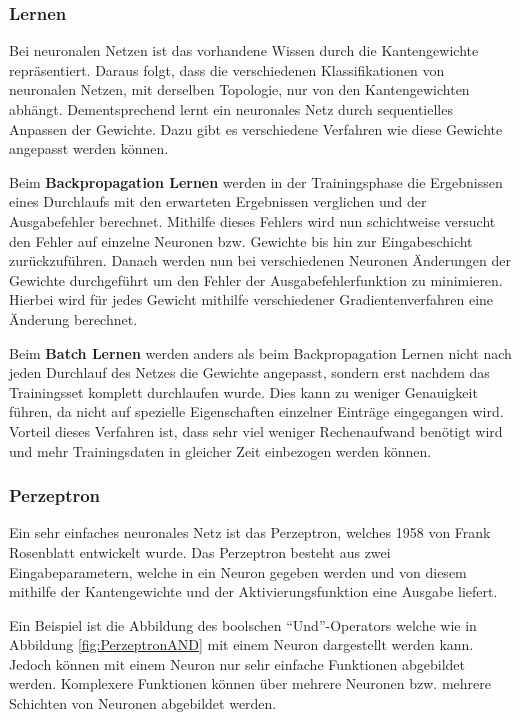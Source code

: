     \subsubsection{Lernen}
    Bei neuronalen Netzen ist das vorhandene Wissen durch die Kantengewichte repräsentiert.
    Daraus folgt, dass die verschiedenen Klassifikationen von neuronalen Netzen, mit derselben Topologie, nur von den Kantengewichten abhängt.
    Dementsprechend lernt ein neuronales Netz durch sequentielles Anpassen der Gewichte.
    Dazu gibt es verschiedene Verfahren wie diese Gewichte angepasst werden können.
    \newline

    \noindent
    Beim \textbf{Backpropagation Lernen} werden in der Trainingsphase die Ergebnissen eines Durchlaufs mit den erwarteten Ergebnissen verglichen und der Ausgabefehler berechnet.
    Mithilfe dieses Fehlers wird nun schichtweise versucht den Fehler auf einzelne Neuronen bzw. Gewichte bis hin zur Eingabeschicht zurückzuführen.
    Danach werden nun bei verschiedenen Neuronen Änderungen der Gewichte durchgeführt um den Fehler der Ausgabefehlerfunktion zu minimieren.
    Hierbei wird für jedes Gewicht mithilfe verschiedener Gradientenverfahren eine Änderung berechnet.
    \newline

    \noindent
    Beim \textbf{Batch Lernen} werden anders als beim Backpropagation Lernen nicht nach jeden Durchlauf des Netzes die Gewichte angepasst, sondern erst nachdem das Trainingsset komplett durchlaufen wurde.
    Dies kann zu weniger Genauigkeit führen, da nicht auf spezielle Eigenschaften einzelner Einträge eingegangen wird.
    Vorteil dieses Verfahren ist, dass sehr viel weniger Rechenaufwand benötigt wird und mehr Trainingsdaten in gleicher Zeit einbezogen werden können.
    
    \subsubsection{Perzeptron}
    Ein sehr einfaches neuronales Netz ist das Perzeptron, welches 1958 von Frank Rosenblatt entwickelt wurde.
    Das Perzeptron besteht aus zwei Eingabeparametern, welche in ein Neuron gegeben werden und von diesem mithilfe der Kantengewichte und der Aktivierungsfunktion eine Ausgabe liefert.

    Ein Beispiel ist die Abbildung des boolschen "`Und"'-Operators welche wie in Abbildung \ref{fig:PerzeptronAND} mit einem Neuron dargestellt werden kann.
    Jedoch können mit einem Neuron nur sehr einfache Funktionen abgebildet werden. 
    Komplexere Funktionen können über mehrere Neuronen bzw. mehrere Schichten von Neuronen abgebildet werden.

